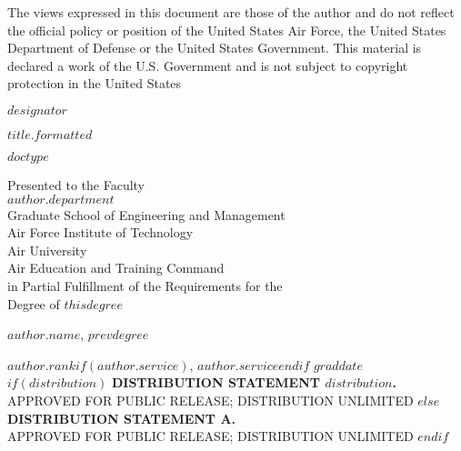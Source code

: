 \documentclass[12pt,letterpaper,toc=flat,oneside]{book}
\begin{document}
	\thispagestyle{empty}
	\singlespacing
	\null	
	\vfill 
	\noindent The views expressed in this document are those of the
author and do not reflect the official policy or position of the
United States Air Force, the United States Department of Defense or
the United States Government.  This material is declared a work of the
U.S. Government and is not subject to copyright protection in the
United States
	\vfill 
	\doublespacing
	\newpage
	\pagestyle{plain}
    \begin{titlepage}
	\thispagestyle{empty}
	\noindent $designator$  
	\vfill
	\begin{center}
	    \MakeUppercase{$title.formatted$}\par
	    \vskip 1cm
	    \MakeUppercase{$doctype$}\par
	    \vskip 1cm
	    Presented to the Faculty\\
	    $author.department$\\
	    Graduate School of Engineering and Management~\\
	    Air Force Institute of Technology~\\
	    Air University~\\
	    Air Education and Training Command~\\
	    in Partial Fulfillment of the Requirements for the~\\
	    Degree of $thisdegree$\\
	    \vskip 1cm
	    {$author.name$, $prevdegree$\par}
	    {$author.rank$$if(author.service)$, \MakeUppercase{$author.service$}$endif$}
	    \vskip 1cm
	    $graddate$
	    \vskip 1cm
	    $if(distribution)$
	    \MakeUppercase{\textbf{distribution statement $distribution$.}}\\[-8pt]
	    \MakeUppercase{approved for public release; distribution unlimited}
	    $else$
	    \MakeUppercase{\textbf{distribution statement a.}}\\[-8pt]
	    \MakeUppercase{Approved for Public Release; distribution unlimited}
	    $endif$	    
	    \vfill
	\end{center}
	\newpage 
	\pagestyle{plain}
    \end{titlepage}
\end{document}
